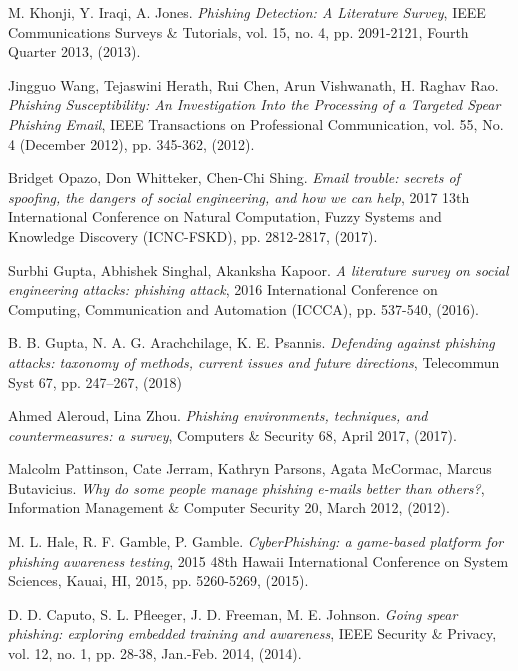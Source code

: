 \documentclass[a4paper]{article}
\begin{document}
\begin{thebibliography}{1}
M. Khonji, Y. Iraqi, A. Jones. \emph{Phishing Detection: A Literature Survey}, IEEE Communications Surveys \& Tutorials, vol. 15, no. 4, pp. 2091-2121, Fourth Quarter 2013, (2013).

Jingguo Wang, Tejaswini Herath, Rui Chen, Arun Vishwanath, H. Raghav Rao. \emph{Phishing Susceptibility: An Investigation Into the Processing of a Targeted Spear Phishing Email}, IEEE Transactions on Professional Communication, vol. 55, No. 4 (December 2012), pp. 345-362, (2012).

Bridget Opazo, Don Whitteker, Chen-Chi Shing. \emph{Email trouble: secrets of spoofing, the dangers of social engineering, and how we can help}, 2017 13th International Conference on Natural Computation, Fuzzy Systems and Knowledge Discovery (ICNC-FSKD), pp. 2812-2817, (2017).

Surbhi Gupta, Abhishek Singhal, Akanksha Kapoor. \emph{A literature survey on social engineering attacks: phishing attack}, 2016 International Conference on Computing, Communication and Automation (ICCCA), pp. 537-540, (2016).

B. B. Gupta, N. A. G. Arachchilage, K. E. Psannis. \emph{Defending against phishing attacks: taxonomy of methods, current issues and future directions}, Telecommun Syst 67, pp. 247–267, (2018)

Ahmed Aleroud, Lina Zhou. \emph{Phishing environments, techniques, and countermeasures: a survey}, Computers \& Security 68, April 2017, (2017).

Malcolm Pattinson, Cate Jerram, Kathryn Parsons, Agata McCormac, Marcus Butavicius. \emph{Why do some people manage phishing e-mails better than others?}, Information Management \& Computer Security 20, March 2012, (2012).

M. L. Hale, R. F. Gamble, P. Gamble. \emph{CyberPhishing: a game-based platform for phishing awareness testing}, 2015 48th Hawaii International Conference on System Sciences, Kauai, HI, 2015, pp. 5260-5269, (2015).

D. D. Caputo, S. L. Pfleeger, J. D. Freeman, M. E. Johnson. \emph{Going spear phishing: exploring embedded training and awareness}, IEEE Security \& Privacy, vol. 12, no. 1, pp. 28-38, Jan.-Feb. 2014, (2014).


\end{thebibliography}
\end{document}
